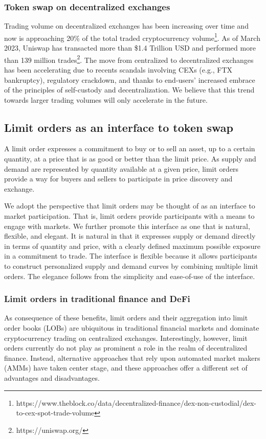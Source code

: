 \documentclass[11pt, reqno]{amsart}
\theoremstyle{definition}
\theoremstyle{remark}
\begin{document}
\subsubsection{Token swap on decentralized exchanges}
Trading volume on decentralized exchanges has been increasing over time and now
is approaching 20\% of the total traded cryptocurrency
volume\footnote{https://www.theblock.co/data/decentralized-finance/dex-non-custodial/dex-to-cex-spot-trade-volume}.
As of March 2023, Uniswap has transacted more than \$1.4 Trillion USD and
performed more than 139 million trades\footnote{https://uniswap.org/}.
The move from centralized to decentralized exchanges has been accelerating due
to recents scandals involving CEXs (e.g., FTX bankruptcy), regulatory
crackdown, and thanks to end-users' increased embrace of the principles of
self-custody and decentralization.
We believe that this trend towards larger trading volumes will only accelerate
in the future.

\subsection{Limit orders as an interface to token swap}
A limit order expresses a commitment to buy or to sell an asset, up to
a certain quantity, at a price that is as good or better than the limit price.
As supply and demand are represented by quantity available at a given price,
limit orders provide a way for buyers and sellers to participate in price
discovery and exchange.

We adopt the perspective that limit orders may be thought of as an interface
to market participation. That is, limit orders provide participants with a
means to engage with markets. We further promote this interface as one that
is natural, flexible, and elegant. It is natural in that it expresses
supply or demand directly in terms of quantity and price, with a clearly
defined maximum possible exposure in a commitment to trade. The interface is
flexible because it allows participants to construct personalized supply and
demand curves by combining multiple limit orders. The elegance follows from the
simplicity and ease-of-use of the interface.

\subsubsection{Limit orders in traditional finance and DeFi}
As consequence of these benefits, limit orders and their aggregation into
limit order books (LOBs) are ubiquitous in traditional financial markets
and dominate cryptocurrency trading on centralized exchanges. Interestingly,
however, limit orders currently do not play as prominent a role in the realm of
decentralized finance. Instead, alternative approaches that rely upon
automated market makers (AMMs) have taken center stage, and these approaches
offer a different set of advantages and disadvantages.
\end{document}
